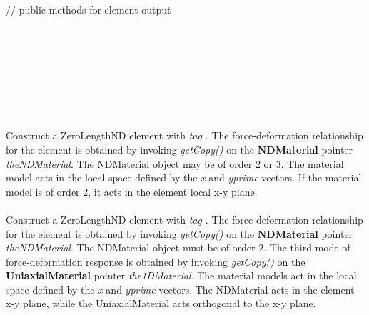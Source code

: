 \indent    // public methods for element output \\
 \\
 \\
 \\    
 \\    

 \\
 \\
    


  \\
 \\
Construct a ZeroLengthND element with {\em tag} .
The force-deformation relationship for the element is obtained by invoking
{\em getCopy()} on the {\bf NDMaterial} pointer {\em theNDMaterial}.
The NDMaterial object may be of order 2 or 3.
The material model acts in the local space defined by the {\em x} and
{\em yprime} vectors. If the material model is of order 2, it acts in the
element local x-y plane. \\

 \\
Construct a ZeroLengthND element with {\em tag} .
The force-deformation relationship for the element is obtained by invoking
{\em getCopy()} on the {\bf NDMaterial} pointer {\em theNDMaterial}.
The NDMaterial object must be of order 2. The third mode of force-deformation
response is obtained by invoking {\em getCopy()} on the {\bf UniaxialMaterial}
pointer {\em the1DMaterial}.
The material models act in the local space defined by the {\em x} and
{\em yprime} vectors. The NDMaterial acts in the element x-y plane, while
the UniaxialMaterial acts orthogonal to the x-y plane. \\

